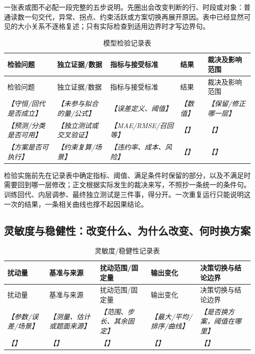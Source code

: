 \documentclass[UTF8,zihao=-4]{ctexart}
\newcommand{\slot}[1]{\textcolor{inkblue}{\textit{【#1】}}}
\begin{document}
一张表或图不必配一段完整的五步说明。先圈出会改变判断的行、时段或对象：普通读数一句交代，异常、拐点、约束活跃或方案切换再展开原因。表中已经显然可见的大小关系不逐格复述；只有实际检查到适用边界时才写边界句。

\begin{longtable}{p{2.6cm}p{3.4cm}p{3.0cm}p{3.0cm}p{2.8cm}}
\caption{模型检验记录表}\label{tab:template-validation-ledger}\\
\toprule
检验问题 & 独立证据/数据 & 指标与接受标准 & 结果 & 裁决及影响范围\\
\midrule
\endfirsthead
\toprule
检验问题 & 独立证据/数据 & 指标与接受标准 & 结果 & 裁决及影响范围\\
\midrule
\endhead
\slot{守恒/回代是否成立} & \slot{未参与拟合的量/公式} & \slot{误差定义、阈值} & \slot{数值} & \slot{保留/修正哪一层}\\
\slot{预测/分类是否可用} & \slot{独立测试或交叉验证} & \slot{MAE/RMSE/召回等} & \slot{} & \slot{}\\
\slot{方案是否可执行} & \slot{约束复算/场景} & \slot{违约率、成本、风险} & \slot{} & \slot{}\\
\bottomrule
\end{longtable}

检验实施前先在记录表中确定指标、阈值、满足条件时保留的部分，以及不满足时需要回到哪一层修改；正文根据实际发生的裁决来写，不照抄一条统一的条件句。训练回代、内层调参、最终独立测试是三件事，得分开。一次重复运行只能说明这一次的结果，一条相关曲线也撑不起因果结论。

\subsection{灵敏度与稳健性：改变什么、为什么改变、何时换方案}

\begin{longtable}{p{2.4cm}p{3.0cm}p{3.0cm}p{3.0cm}p{3.5cm}}
\caption{灵敏度/稳健性记录表}\label{tab:template-sensitivity-ledger}\\
\toprule
扰动量 & 基准与来源 & 扰动范围/固定量 & 输出变化 & 决策切换与结论边界\\
\midrule
\endfirsthead
\toprule
扰动量 & 基准与来源 & 扰动范围/固定量 & 输出变化 & 决策切换与结论边界\\
\midrule
\endhead
\slot{参数/误差/场景} & \slot{测量、估计或题面来源} & \slot{范围、步长、其余固定} & \slot{最大/平均/排序/曲线} & \slot{是否换方案，阈值在哪里}\\
\slot{} & \slot{} & \slot{} & \slot{} & \slot{}\\
\bottomrule
\end{longtable}
\end{document}
